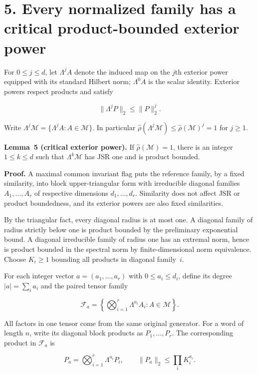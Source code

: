 \documentclass[11pt,a4paper]{article}
\begin{document}
\section{5. Every normalized family has a critical product-bounded exterior power}\label{every-normalized-family-has-a-critical-product-bounded-exterior-power}

For \(0\le j\le d\), let \(\Lambda^j A\) denote the induced map on the \(j\)th exterior power equipped with its standard Hilbert norm; \(\Lambda^0 A\) is the scalar identity. Exterior powers respect products and satisfy

\[
\|\Lambda^j P\|_2\le\|P\|_2^j.
\tag{5}
\]

Write \(\Lambda^j\mathcal M=\{\Lambda^j A:A\in\mathcal M\}\). In particular \(\widehat\rho(\Lambda^j\mathcal M)\le\widehat\rho(\mathcal M)^j=1\) for \(j\ge1\).

\textbf{Lemma~5 (critical exterior power).} If \(\widehat\rho(\mathcal M)=1\), there is an integer \(1\le k\le d\) such that \(\Lambda^k\mathcal M\) has JSR one and is product bounded.

\textbf{Proof.} A maximal common invariant flag puts the reference family, by a fixed similarity, into block upper-triangular form with irreducible diagonal families \(A_{1},\ldots,A_r\) of respective dimensions \(d_1,\ldots,d_r\). Similarity does not affect JSR or product boundedness, and its exterior powers are also fixed similarities.

By the triangular fact, every diagonal radius is at most one. A diagonal family of radius strictly below one is product bounded by the preliminary exponential bound. A diagonal irreducible family of radius one has an extremal norm, hence is product bounded in the spectral norm by finite-dimensional norm equivalence. Choose \(K_i\ge1\) bounding all products in diagonal family~\(i\).

For each integer vector \(a=(a_1,\ldots,a_r)\) with \(0\le a_i\le d_i\), define its degree \(|a|=\sum_i a_i\) and the paired tensor family

\[
\mathcal F_a=
\left\{\bigotimes_{i=1}^r\Lambda^{a_i} A_i:A\in\mathcal M\right\}.
\]

All factors in one tensor come from the same original generator. For a word of length \(n\), write its diagonal block products as \(P_1,\ldots,P_r\). The corresponding product in \(\mathcal F_a\) is

\[
P_a=\bigotimes_{i=1}^r\Lambda^{a_i}P_i,
\qquad \|P_a\|_2\le\prod_iK_i^{a_i}.
\tag{6}
\]
\end{document}
